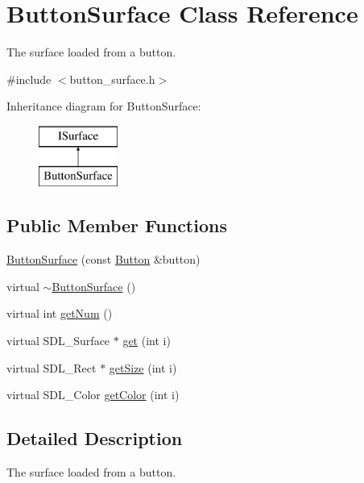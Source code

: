 \hypertarget{class_button_surface}{}\section{Button\+Surface Class Reference}
\label{class_button_surface}


The surface loaded from a button.  




{\ttfamily \#include $<$button\+\_\+surface.\+h$>$}

Inheritance diagram for Button\+Surface\+:\begin{figure}[H]
\begin{center}
\leavevmode
\includegraphics[height=2.000000cm]{class_button_surface}
\end{center}
\end{figure}
\subsection*{Public Member Functions}
\begin{DoxyCompactItemize}
\item 
\mbox{\hyperlink{class_button_surface_a47947226032ffc3af61d8e46060fdb0f}{Button\+Surface}} (const \mbox{\hyperlink{class_button}{Button}} \&button)
\item 
virtual \mbox{\hyperlink{class_button_surface_aabb7a64d5690fe392b8e3ca645640701}{$\sim$\+Button\+Surface}} ()
\item 
virtual int \mbox{\hyperlink{class_button_surface_a32a0a3c0d2a706d2aad7ac32d2c96ccd}{get\+Num}} ()
\item 
virtual S\+D\+L\+\_\+\+Surface $\ast$ \mbox{\hyperlink{class_button_surface_a296e13e3b1e7b0d52cfb67f6627d6f91}{get}} (int i)
\item 
virtual S\+D\+L\+\_\+\+Rect $\ast$ \mbox{\hyperlink{class_button_surface_a6d9fea1db4128f1cafe1237fd217870d}{get\+Size}} (int i)
\item 
virtual S\+D\+L\+\_\+\+Color \mbox{\hyperlink{class_button_surface_a4ba118fccc0224e235efcb3b26f0d26c}{get\+Color}} (int i)
\end{DoxyCompactItemize}


\subsection{Detailed Description}
The surface loaded from a button. 

